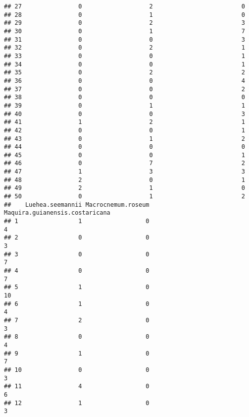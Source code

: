 \documentclass[
]{article}
\begin{document}
\begin{verbatim}
## 27                0                   2                         0
## 28                0                   1                         0
## 29                0                   2                         3
## 30                0                   1                         7
## 31                0                   0                         3
## 32                0                   2                         1
## 33                0                   0                         1
## 34                0                   0                         1
## 35                0                   2                         2
## 36                0                   0                         4
## 37                0                   0                         2
## 38                0                   0                         0
## 39                0                   1                         1
## 40                0                   0                         3
## 41                1                   2                         1
## 42                0                   0                         1
## 43                0                   1                         2
## 44                0                   0                         0
## 45                0                   0                         1
## 46                0                   7                         2
## 47                1                   3                         3
## 48                2                   0                         1
## 49                2                   1                         0
## 50                0                   1                         2
##    Luehea.seemannii Macrocnemum.roseum Maquira.guianensis.costaricana
## 1                 1                  0                              4
## 2                 0                  0                              3
## 3                 0                  0                              7
## 4                 0                  0                              7
## 5                 1                  0                             10
## 6                 1                  0                              4
## 7                 2                  0                              3
## 8                 0                  0                              4
## 9                 1                  0                              7
## 10                0                  0                              3
## 11                4                  0                              6
## 12                1                  0                              3

\end{verbatim}
\end{document}
